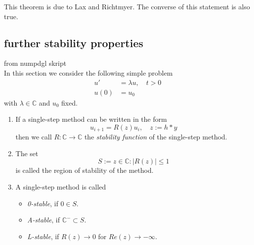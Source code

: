 	This theorem is due to Lax and Richtmyer. The converse of this statement is also true. 

	\subsection{further stability properties}
		from numpdgl skript \\
		In this section we consider the following simple problem
		\begin{align}
			u' &= \lambda u, \quad t > 0 \\
			u(0) &= u_0
		\end{align}
		with $\lambda \in \mathbb{C}$ and $u_0$ fixed.
		
		\begin{definition}
			\begin{enumerate}
				\item 
				If a single-step method can be written in the form
				\begin{equation}
					u_{i+1} = R(z) u_i, \quad z:= h*y
				\end{equation}
				then we call $R: \mathbb{C} \to \mathbb{C}$ the \emph{stability function} of the single-step method.
				\item 
				The set
				\begin{equation}
					S := {z \in \mathbb{C} : |R(z)| \leq 1}
				\end{equation}
				is called the region of stability of the method.
				\item 
				A single-step method is called
				\begin{itemize}
					\item \emph{0-stable}, if $0 \in S$.
					\item \emph{A-stable}, if $\mathbb{C}^- \subset S$.
					\item \emph{L-stable}, if $R(z) \to 0$ for $Re(z) \to -\infty$.
				\end{itemize}
			\end{enumerate}
		\end{definition}

		
		
